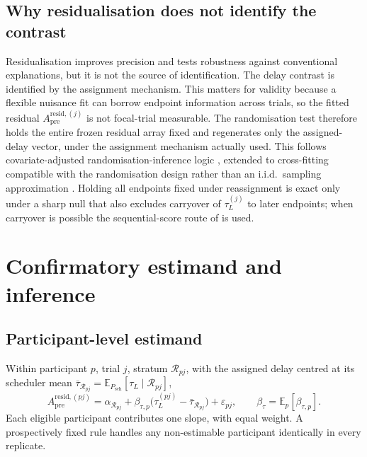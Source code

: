 \documentclass[11pt,a4paper]{article}
\theoremstyle{definition}
\newcommand{\Apre}{A_{\mathrm{pre}}}
\newcommand{\tauL}{\tau_L}
\begin{document}
\subsection{Why residualisation does not identify the contrast}
\label{sec:si-design-based}

Residualisation improves precision and tests robustness against conventional
explanations, but it is not the source of identification. The delay contrast is
identified by the assignment mechanism. This matters for validity because a
flexible nuisance fit can borrow endpoint information across trials, so the fitted
residual \(\Apre^{\mathrm{resid},(j)}\) is not focal-trial measurable. The
randomisation test therefore holds the entire frozen residual array fixed and
regenerates only the assigned-delay vector, under the assignment mechanism
actually used.
This follows covariate-adjusted randomisation-inference logic
\citep{ZhaoDing2021}, extended to cross-fitting compatible with the
randomisation design rather than an i.i.d.\ sampling approximation
\citep{LuEtAl2025}. Holding
all endpoints fixed under reassignment is exact only under a sharp null that also
excludes carryover of \(\tauL^{(j)}\) to later endpoints; when carryover is
possible the sequential-score route of  is used.

\section{Confirmatory estimand and inference}
\label{sec:si-estimand-inference}

\subsection{Participant-level estimand}
\label{sec:si-estimand}

Within participant \(p\), trial \(j\), stratum \(\mathcal{R}_{pj}\), with the
assigned delay centred at its scheduler mean
\(\bar\tau_{\mathcal{R}_{pj}}=\mathbb{E}_{P_{\mathrm{sch}}}[\tauL\mid\mathcal{R}_{pj}]\),
\begin{equation}
\label{eq:si-participant-slope}
\Apre^{\mathrm{resid},(pj)}
=\alpha_{\mathcal{R}_{pj}}
+\beta_{\tau,p}\bigl(\tauL^{(pj)}-\bar\tau_{\mathcal{R}_{pj}}\bigr)
+\varepsilon_{pj},
\qquad
\beta_\tau=\mathbb{E}_p[\beta_{\tau,p}].
\end{equation}
Each eligible participant contributes one slope, with equal weight. A
prospectively fixed rule handles any non-estimable participant identically in
every replicate.
\end{document}
